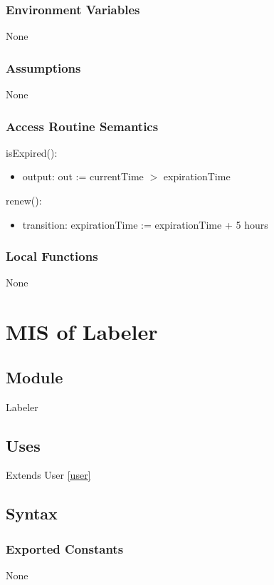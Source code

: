 \documentclass[12pt, titlepage]{article}
\begin{document}
\subsubsection{Environment Variables}
None

\subsubsection{Assumptions}
None

\subsubsection{Access Routine Semantics}

\noindent isExpired():
\begin{itemize}
\item output: out := currentTime $>$ expirationTime
\end{itemize}

\noindent renew():
\begin{itemize}
\item transition: expirationTime := expirationTime + 5 hours
\end{itemize}

\subsubsection{Local Functions}
None

\section{MIS of Labeler} \label{labeler}

\subsection{Module}

Labeler

\subsection{Uses}
Extends User \ref{user}

\subsection{Syntax}

\subsubsection{Exported Constants}
None
\end{document}
